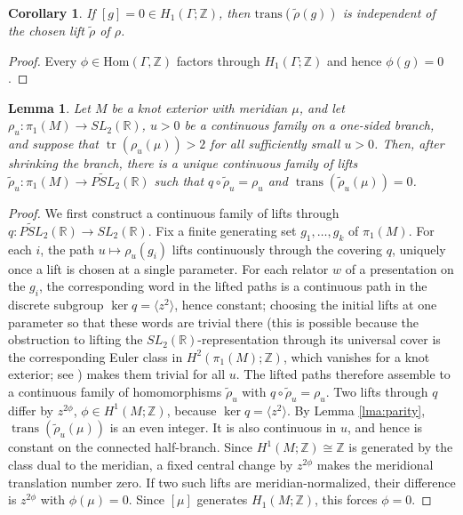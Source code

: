 \documentclass{article}
\theoremstyle{plain}
\theoremstyle{definition}
\theoremstyle{plain}
\theoremstyle{plain}
\newtheorem{corollary}[theorem]{Corollary}
\theoremstyle{plain}
\newtheorem{lemma}[theorem]{Lemma}
\theoremstyle{remark}
\theoremstyle{remark}
\theoremstyle{plain}
\theoremstyle{plain}
\theoremstyle{plain}
\theoremstyle{plain}
\begin{document}
\begin{corollary}\label{cor:nullhomologous}
If $[g] = 0 \in H_1(\Gamma; \mathbb{Z})$, then $\mathrm{trans}(\widetilde\rho(g))$ is independent of the chosen lift $\widetilde\rho$ of $\rho$. 
\end{corollary}

\begin{proof}
Every $\phi \in \mathrm{Hom}(\Gamma, \mathbb{Z})$ factors through $H_1(\Gamma; \mathbb{Z})$ and hence $\phi(g) = 0$. 
\end{proof}

\begin{lemma}\label{lma:normalizedlift}
Let $M$ be a knot exterior with meridian $\mu$, and let $\rho_u:\pi_1(M)\longrightarrow SL_2(\mathbb R)$, $u>0$ be a continuous family on a one-sided branch, and suppose that $\operatorname{tr}(\rho_u(\mu))>2$ for all sufficiently small $u>0$. Then, after shrinking the branch, there is a unique continuous family of lifts $\widetilde\rho_u: \pi_1(M)\longrightarrow\widetilde{PSL}_2(\mathbb R)$ such that $q\circ\widetilde\rho_u=\rho_u$ and $\operatorname{trans}(\widetilde\rho_u(\mu))=0$. 
\end{lemma}

\begin{proof}
We first construct a continuous family of lifts through $q: \widetilde{PSL}_2(\mathbb{R}) \to SL_2(\mathbb{R})$. Fix a finite generating set $g_1, \dots, g_k$ of $\pi_1(M)$. For each $i$, the path $u \mapsto \rho_u(g_i)$ lifts continuously through the covering $q$, uniquely once a lift is chosen at a single parameter. For each relator $w$ of a presentation on the $g_i$, the corresponding word in the lifted paths is a continuous path in the discrete subgroup $\ker q = \langle z^2 \rangle$, hence constant; choosing the initial lifts at one parameter so that these words are trivial there (this is possible because the obstruction to lifting the $SL_2(\mathbb R)$-representation through its universal cover is the corresponding Euler class in $H^2(\pi_1(M); \mathbb{Z})$, which vanishes for a knot exterior; see \cite{cullerdunfield}) makes them trivial for all $u$. The lifted paths therefore assemble to a continuous family of homomorphisms $\widetilde{\rho}_u$ with $q \circ \widetilde{\rho}_u = \rho_u$. Two lifts through $q$ differ by $z^{2\phi}$, $\phi\in H^1(M;\mathbb Z)$, because $\ker q=\langle z^2\rangle$. By Lemma \ref{lma:parity}, $\operatorname{trans}(\widetilde\rho_u(\mu))$ is an even integer. It is also continuous in $u$, and hence is constant on the connected half-branch. Since $H^1(M;\mathbb Z)\cong\mathbb Z$ is generated by the class dual to the meridian, a fixed central change by $z^{2\phi}$ makes the meridional translation number zero. If two such lifts are meridian-normalized, their difference is $z^{2\phi}$ with $\phi(\mu)=0$. Since $[\mu]$ generates $H_1(M;\mathbb Z)$, this forces $\phi=0$.
\end{proof}
\end{document}

